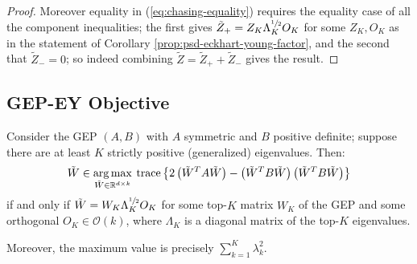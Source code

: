 \begin{proof}
    Moreover equality in (\ref{eq:chasing-equality}) requires the equality case of all the component inequalities; the first gives $\tilde{Z}_+ = Z_K \Lambda_K^{\sfrac{1}{2}} O_K$ for some $Z_K,O_K$ as in the statement of Corollary \ref{prop:psd-eckhart-young-factor}, and the second that $\tilde{Z}_- = 0$; so indeed combining $\tilde{Z} = \tilde{Z}_+ + \tilde{Z}_-$ gives the result.
\end{proof}

\subsection{GEP-EY Objective}
\begin{proposition}
    Consider the GEP $(A,B)$ with $A$ symmetric and $B$ positive definite; suppose there are at least $K$ strictly positive (generalized) eigenvalues. Then:
    \begin{align*}
        \Tilde{W} \in \operatorname*{arg\,max}_{\Tilde{W} \in \mathbb{R}^{d\times k}} \: \operatorname{trace}\left\{2 \left(\Tilde{W}^T A \Tilde{W}\right) - \left(\Tilde{W}^T B \Tilde{W}\right) \left(\Tilde{W}^T B \Tilde{W}\right) \right\}
    \end{align*}
    if and only if $\Tilde{W} = W_K \Lambda_K^{\sfrac{1}{2}} O_K$ for some top-$K$ matrix $W_K$ of the GEP and some orthogonal $O_K \in \mathcal{O}(k)$, where $\Lambda_K$ is a diagonal matrix of the top-$K$ eigenvalues.

    Moreover, the maximum value is precisely $\sum_{k=1}^K \lambda_k^2$.
\end{proposition}

